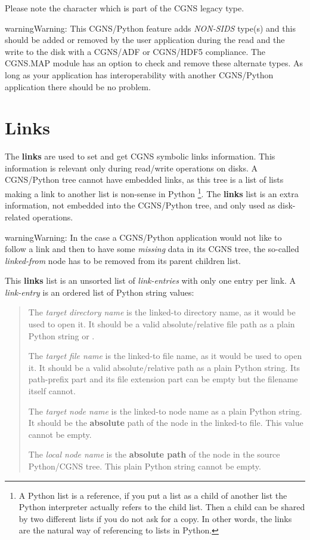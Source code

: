 \documentclass[a4paper,10pt,english]{sphinxmanual}
\begin{document}
Please note the \code{{[}"{]}} character which is part of the CGNS legacy type.

\begin{notice}{warning}{Warning:}
This CGNS/Python feature adds \emph{NON-SIDS} type(s) and this should be
added or removed by the user application during the read and the
write to the disk with a CGNS/ADF or CGNS/HDF5 compliance.
The CGNS.MAP module has an option to check and remove these alternate
types. As long as your application has
interoperability with another CGNS/Python application there should be
no problem.
\end{notice}


\section{Links}
\label{sids-to-python:links}
The \textbf{links} are used to set and get CGNS symbolic links information.
This information is relevant only during read/write operations on disks.
A CGNS/Python tree cannot have embedded links, as this tree is a list of
lists making a link to another list is non-sense in Python \footnote{
A Python list is a reference, if you put a list as a child of another
list the Python interpreter actually refers to the child list. Then
a child can be shared by two different lists if you do not ask for
a copy. In other words, the links are the natural way of referencing
to lists in Python.
}.
The \textbf{links} list is an extra information, not embedded into the CGNS/Python
tree, and only used as disk-related operations.

\begin{notice}{warning}{Warning:}
In the case a CGNS/Python application would not like to follow a
link and then to have some \emph{missing} data in its CGNS tree, the
so-called \emph{linked-from} node has to be removed from its parent
children list.
\end{notice}

This \textbf{links} list is an unsorted list of \emph{link-entries} with only one
entry per link. A \emph{link-entry} is an ordered list of Python string values:
\begin{quote}

The \emph{target directory name} is the linked-to directory name, as it would be
used to open it. It should be a valid absolute/relative file path as a plain
Python string or .

The \emph{target file name} is the linked-to file name, as it would be used to
open it. It should be a valid absolute/relative path as a plain Python string.
Its path-prefix part and its file extension part can be empty but the
filename itself cannot.

The \emph{target node name} is the linked-to node name as a plain Python string.
It should be the \textbf{absolute} path of the node in the linked-to file.
This value cannot be empty.

The \emph{local node name} is the \textbf{absolute path} of the node in the source
Python/CGNS tree. This plain Python string cannot be empty.
\end{quote}
\end{document}
